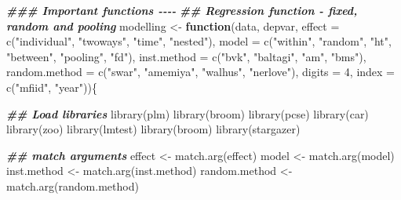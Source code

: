 \documentclass[a4paper,nobind]{templates/ociamthesis}
\newenvironment{Shaded}{\begin{snugshade}}{\end{snugshade}}
\newcommand{\AttributeTok}[1]{\textcolor[rgb]{0.77,0.63,0.00}{#1}}
\newcommand{\ControlFlowTok}[1]{\textcolor[rgb]{0.13,0.29,0.53}{\textbf{#1}}}
\newcommand{\DecValTok}[1]{\textcolor[rgb]{0.00,0.00,0.81}{#1}}
\newcommand{\DocumentationTok}[1]{\textcolor[rgb]{0.56,0.35,0.01}{\textbf{\textit{#1}}}}
\newcommand{\FunctionTok}[1]{\textcolor[rgb]{0.00,0.00,0.00}{#1}}
\newcommand{\NormalTok}[1]{#1}
\newcommand{\OtherTok}[1]{\textcolor[rgb]{0.56,0.35,0.01}{#1}}
\newcommand{\StringTok}[1]{\textcolor[rgb]{0.31,0.60,0.02}{#1}}
\renewenvironment{Shaded}
{
  \vspace{10pt}%
  \begin{snugshade}%
}{%
  \end{snugshade}%
  \vspace{8pt}%
}
\begin{document}
\begin{Shaded}
\begin{Highlighting}[]
\DocumentationTok{\#\#\# Important functions {-}{-}{-}{-}}
\DocumentationTok{\#\# Regression function {-} fixed, random and pooling}
\NormalTok{modelling }\OtherTok{\textless{}{-}} \ControlFlowTok{function}\NormalTok{(data, depvar,}
                      \AttributeTok{effect =} \FunctionTok{c}\NormalTok{(}\StringTok{"individual"}\NormalTok{, }\StringTok{"twoways"}\NormalTok{, }\StringTok{"time"}\NormalTok{, }\StringTok{"nested"}\NormalTok{),}
                      \AttributeTok{model =} \FunctionTok{c}\NormalTok{(}\StringTok{"within"}\NormalTok{, }\StringTok{"random"}\NormalTok{, }\StringTok{"ht"}\NormalTok{, }\StringTok{"between"}\NormalTok{, }\StringTok{"pooling"}\NormalTok{, }\StringTok{"fd"}\NormalTok{),}
                      \AttributeTok{inst.method =} \FunctionTok{c}\NormalTok{(}\StringTok{"bvk"}\NormalTok{, }\StringTok{"baltagi"}\NormalTok{, }\StringTok{"am"}\NormalTok{, }\StringTok{"bms"}\NormalTok{),}
                      \AttributeTok{random.method =} \FunctionTok{c}\NormalTok{(}\StringTok{"swar"}\NormalTok{, }\StringTok{"amemiya"}\NormalTok{, }\StringTok{"walhus"}\NormalTok{, }\StringTok{"nerlove"}\NormalTok{),}
                      \AttributeTok{digits =} \DecValTok{4}\NormalTok{, }\AttributeTok{index =} \FunctionTok{c}\NormalTok{(}\StringTok{"mfiid"}\NormalTok{, }\StringTok{"year"}\NormalTok{))\{}
  
\DocumentationTok{\#\# Load libraries}
  \FunctionTok{library}\NormalTok{(plm)}
  \FunctionTok{library}\NormalTok{(broom)}
  \FunctionTok{library}\NormalTok{(pcse)}
  \FunctionTok{library}\NormalTok{(car)}
  \FunctionTok{library}\NormalTok{(zoo)}
  \FunctionTok{library}\NormalTok{(lmtest)}
  \FunctionTok{library}\NormalTok{(broom)}
  \FunctionTok{library}\NormalTok{(stargazer)}
  
  \DocumentationTok{\#\# match arguments}
\NormalTok{  effect }\OtherTok{\textless{}{-}} \FunctionTok{match.arg}\NormalTok{(effect)}
\NormalTok{  model }\OtherTok{\textless{}{-}} \FunctionTok{match.arg}\NormalTok{(model)}
\NormalTok{  inst.method }\OtherTok{\textless{}{-}} \FunctionTok{match.arg}\NormalTok{(inst.method)}
\NormalTok{  random.method }\OtherTok{\textless{}{-}} \FunctionTok{match.arg}\NormalTok{(random.method)}
  

\end{Highlighting}
\end{Shaded}
\end{document}
